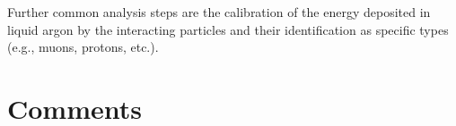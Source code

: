 \documentclass{article}
\begin{document}
Further common analysis steps are the calibration of the energy
deposited in liquid argon by the interacting particles and their
identification as specific types (e.g., muons, protons, etc.).




\clearpage

\section*{Comments}
\label{sec:comments}


\end{document}
